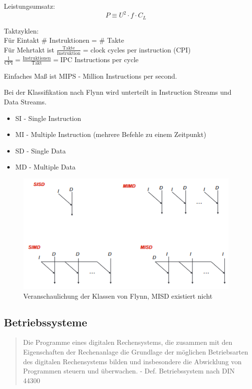\documentclass[a4paper,12pt,leqno]{article}
\begin{document}
Leistungsumsatz:
$$P \equiv U^2 \cdot f \cdot C_L$$

Taktzyklen:\\
Für Eintakt \# Instruktionen = \# Takte\\
Für Mehrtakt ist $\frac{\text{Takte}}{\text{Instruktion}}$ = clock cycles per instruction (CPI)\\
$\frac{1}{\text{CPI}} = \frac{\text{Instruktionen}}{\text{Takt}} = \text{IPC}$ Instructions per cycle

Einfaches Maß ist MIPS - Million Instructions per second.

Bei der Klassifikation nach Flynn wird unterteilt in Instruction Streams und Data Streams.
\begin{itemize}
\item SI - Single Instruction
\item MI - Multiple Instruction (mehrere Befehle zu einem Zeitpunkt)
\item SD - Single Data
\item MD - Multiple Data
\end{itemize}

\begin{figure}[h!]
\centering
\includegraphics[scale=0.7]{Grafiken/Klassifikation-Flynn.png}
\caption{Veranschaulichung der Klassen von Flynn, MISD existiert nicht}
\end{figure}

\subsection{Betriebssysteme}

\begin{quote}
Die Programme eines digitalen Rechensystems, die zusammen mit den Eigenschaften der Rechenanlage die Grundlage der möglichen Betriebsarten des digitalen Rechensystems bilden und insbesondere die Abwicklung von Programmen steuern und überwachen. - Def. Betriebssystem nach DIN 44300
\end{quote}
\end{document}

